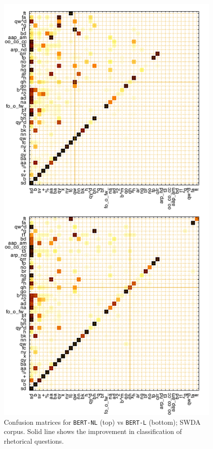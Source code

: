 \documentclass[11pt,a4paper]{article}
\begin{document}
  \begin{figure}
  \centering
  \includegraphics[width=1.0\linewidth]{img/swda-cm.pdf}
  \caption{Confusion matrices for \texttt{BERT-NL} (top) vs \texttt{BERT-L} (bottom); SWDA corpus. Solid line shows the improvement in classification of rhetorical questions.}
    \label{fig:swda-cm}
  \end{figure}
\end{document}
